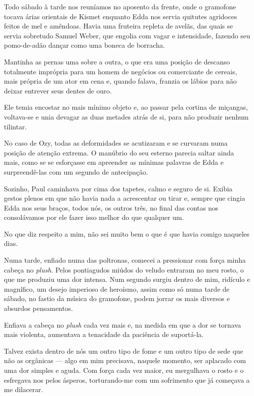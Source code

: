 Todo sábado à tarde nos reuníamos no aposento da frente, onde o gramofone tocava árias orientais de Kismet enquanto Edda nos servia quitutes agridoces feitos de mel e amêndoas. Havia uma fruteira repleta de avelãs, das quais se servia sobretudo Samuel Weber, que engolia com vagar e intensidade, fazendo seu pomo-de-adão dançar como uma boneca de borracha.

Mantinha as pernas uma sobre a outra, o que era uma posição de descanso totalmente imprópria para um homem de negócios ou comerciante de cereais, mais própria de um ator em cena e, quando falava, franzia os lábios para não deixar entrever seus dentes de ouro. 

Ele temia encostar no mais mínimo objeto e, ao passar pela cortina de miçangas, voltava-se e unia devagar as duas metades atrás de si, para não produzir nenhum tilintar.

No caso de Ozy, todas as deformidades se acutizaram e se curvaram numa posição de atenção extrema. O manúbrio do seu esterno parecia saltar ainda mais, como se se esforçasse em apreender as mínimas palavras de Edda e surpreendê-las com um segundo de antecipação.

Sozinho, Paul caminhava por cima dos tapetes, calmo e seguro de si. Exibia gestos plenos em que não havia nada a acrescentar ou tirar e, sempre que cingia Edda nos seus braços, todos nós, os outros três, no final das contas nos consolávamos por ele fazer isso melhor do que qualquer um.

No que diz respeito a mim, não sei muito bem o que é que havia comigo naqueles dias.

Numa tarde, enfiado numa das poltronas, comecei a pressionar com força minha cabeça no \textit{plush}. Pelos pontiagudos miúdos do veludo entraram no meu rosto, o que me produziu uma dor intensa. Num segundo surgiu dentro de mim, ridículo e magnífico, um desejo imperioso de heroísmo, assim como só numa tarde de sábado, no fastio da música do gramofone, podem jorrar os mais diversos e absurdos pensamentos.

Enfiava a cabeça no \textit{plush} cada vez mais e, na medida em que a dor se tornava mais violenta, aumentava a tenacidade da paciência de suportá-la.

Talvez exista dentro de nós um outro tipo de fome e um outro tipo de sede que não as orgânicas --- algo em mim precisava, naquele momento, ser aplacado com uma dor simples e aguda. Com força cada vez maior, eu mergulhava o rosto e o esfregava nos pelos ásperos, torturando-me com um sofrimento que já começava a me dilacerar.

